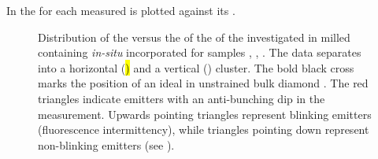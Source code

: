 	In  the \lw for each measured \ZPL is plotted against its \cwl.

	\begin{figure}[!htb]
			\centering
			\caption[Spectral distribution of \siv \ZPLs]{Distribution of the \ZPL \cwl versus the \lw of the \ZPL of the investigated \sivs in milled \nds containing \textit{in-situ} incorporated \sivs for samples \insituF, \insituS, \insituH{}. The data separates into a horizontal (\hl) and a vertical (\vl) cluster. The bold black cross marks the position of an ideal \siv in unstrained bulk diamond \cite{Arend2016a}. The red triangles indicate emitters with an anti-bunching dip in the \gtz measurement. Upwards pointing triangles represent blinking emitters (fluorescence intermittency), while triangles pointing down represent non-blinking emitters (see ).}
			\label{fig::bimodal_distr}
	\end{figure}


